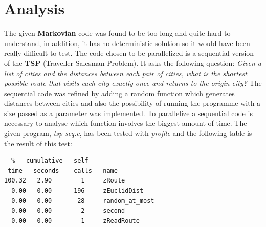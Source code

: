 \documentclass[11pt,conference]{IEEEtran}
\begin{document}
\section{Analysis}
The given \textbf{Markovian} code was found to be too long and quite hard to understand, in addition, it has no deterministic solution so it would have been really difficult to test.
\newline
The code chosen to be parallelized is a sequential version of the \textbf{TSP} (Traveller Salesman Problem). It asks the following question: \textit{Given a list of cities and the distances between each pair of cities, what is the shortest possible route that visits each city exactly once and returns to the origin city?} \cite{citation1}
\newline
The sequential code was refined by adding a random function which generates distances between cities and also the possibility of running the programme with a size passed as a parameter was implemented.
\newline
To parallelize a sequential code is necessary to analyse which function involves the biggest amount of time. The given program, \textit{tsp-seq.c}, has been tested with \textit{profile} and the following table is the result of this test:
\begin{lstlisting}
  %   cumulative   self               
 time   seconds    calls   name    
100.32   2.90        1     zRoute
  0.00   0.00      196     zEuclidDist
  0.00   0.00       28     random_at_most
  0.00   0.00        2     second
  0.00   0.00        1     zReadRoute
\end{lstlisting}
\end{document}
